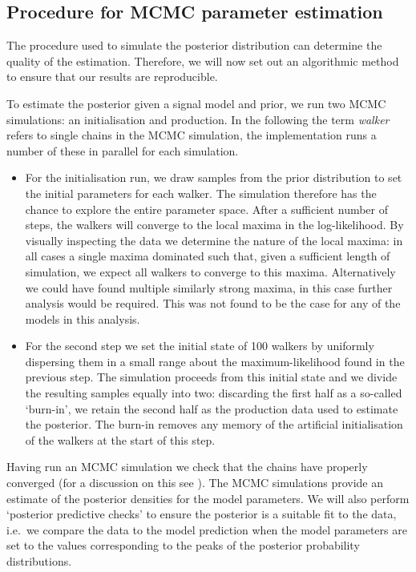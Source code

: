 \documentclass[../full_thesis/full_thesis.tex]{subfiles}
\begin{document}
\begin{subappendices}
\section{Procedure for MCMC parameter estimation}
\label{sec: procedure for the mcmc parameter estimation}

The procedure used to simulate the posterior distribution can determine the
quality of the estimation. Therefore, we will now set out an algorithmic method
to ensure that our results are reproducible.

To estimate the posterior given a signal model and prior, we run two MCMC
simulations: an initialisation and production. In the following the term
\emph{walker} refers to single chains in the MCMC simulation, the
\citet{Foreman-Mackay2013} implementation runs a number of these in parallel
for each simulation.

\begin{itemize}

\item For the initialisation run, we draw samples from the prior distribution
to set the initial parameters for each walker. The simulation therefore has the
chance to explore the entire parameter space. After a sufficient number of
steps, the walkers will converge to the local maxima in the log-likelihood. By
visually inspecting the data we determine the nature of the local maxima: in
all cases a single maxima dominated such that, given a sufficient length of
simulation, we expect all walkers to converge to this maxima. Alternatively we
could have found multiple similarly strong maxima, in this case further
analysis would be required. This was not found to be the case for any of the
models in this analysis.

\item For the second step we set the initial state of 100 walkers by uniformly
dispersing them in a small range about the maximum-likelihood found in the
previous step. The simulation proceeds from this initial state and we divide
the resulting samples equally into two: discarding the first half as a
so-called `burn-in', we retain the second half as the production data used to
estimate the posterior.  The burn-in removes any memory of the artificial
initialisation of the walkers at the start of this step.

\end{itemize}

Having run an MCMC simulation we check that the chains have properly converged
(for a discussion on this see \citet{gelman2013bayesian}).  The MCMC
simulations provide an estimate of the posterior densities for the model
parameters. We will also perform `posterior predictive checks' to ensure the
posterior is a suitable fit to the data, i.e.\ we compare the data to the model
prediction when the model parameters are set to the values corresponding to the
peaks of the posterior probability  distributions.



\end{subappendices}
\end{document}
